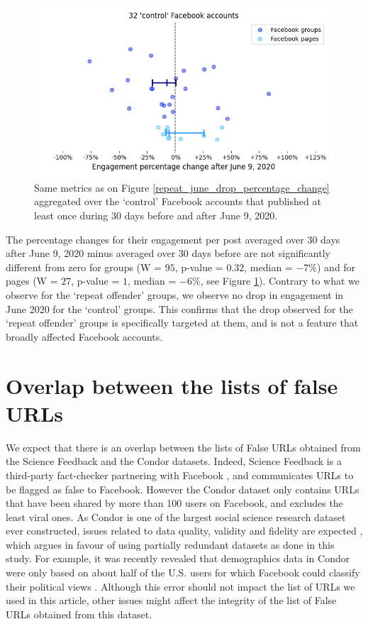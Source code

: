 \documentclass[review]{elsarticle}
\begin{document}
{{\begin{figure}[!h]
\centering
\includegraphics[scale=0.5]{./../figure/supplementary_mainstream_june_drop_percentage_change.png}
\caption{
Same metrics as on Figure \ref{repeat_june_drop_percentage_change} aggregated over the `control' Facebook accounts that published at least once during 30 days before and after June 9, 2020.
}
\label{june_drop_control}
\end{figure}

The percentage changes for their engagement per post averaged over 30 days after June 9, 2020 minus averaged over 30 days before are not significantly different from zero for groups (W = $95$, p-value = $0.32$, median = $-7\%$) and for pages (W = $27$, p-value = $1$, median = $-6\%$, see Figure \ref{june_drop_control}).
Contrary to what we observe for the `repeat offender' groups, we observe no drop in engagement in June 2020 for the `control' groups.
This confirms that the drop observed for the `repeat offender' groups is specifically targeted at them, and is not a feature that broadly affected Facebook accounts.

\section*{Overlap between the lists of false URLs}

We expect that there is an overlap between the lists of False URLs obtained from the Science Feedback and the Condor datasets. 
Indeed, Science Feedback is a third-party fact-checker partnering with Facebook \citep{sciencefeedbackFbPartner}, and communicates URLs to be flagged as false to Facebook.
However the Condor dataset only contains URLs that have been shared by more than 100 users on Facebook, and excludes the least viral ones.
As Condor is one of the largest social science research dataset ever constructed, issues related to data quality, validity and fidelity are expected \cite{messing2020facebook}, which argues in favour of using partially redundant datasets as done in this study.
For example, it was recently revealed that demographics data in Condor were only based on about half of the U.S. users for which Facebook could classify their political views \citep{NYTrevelations}. 
Although this error should not impact the list of URLs we used in this article, other issues might affect the integrity of the list of False URLs obtained from this dataset.

}}
\end{document}
